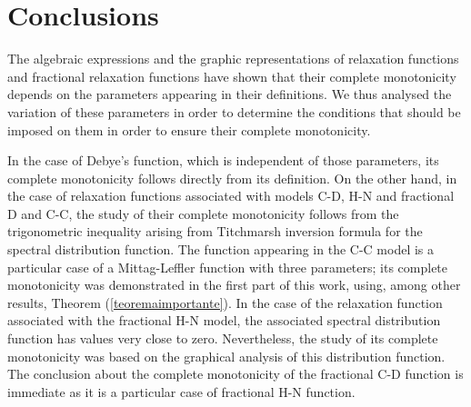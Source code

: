\documentclass[12pt]{amsart}
\numberwithin{equation}{section}
\begin{document}
\section{Conclusions}

The algebraic expressions and the graphic representations of relaxation
functions and fractional relaxation functions have shown that their complete
monotonicity depends on the parameters appearing in their definitions. We
thus analysed the variation of these parameters in order to determine the
conditions that should be imposed on them in order to ensure their complete
monotonicity. 

In the case of Debye's function, which is independent of those parameters,
its complete monotonicity follows directly from its definition. On the
other hand, in the case of relaxation functions associated with models C-D,
H-N and fractional D and C-C, the study of their complete monotonicity
follows from the trigonometric inequality arising from Titchmarsh inversion
formula for the spectral distribution function. The function appearing in the C-C model
is a particular case of a Mittag-Leffler function with three parameters;
its complete monotonicity was demonstrated in the first part of this work,
using, among other results, Theorem (\ref{teoremaimportante}). In the case
of the relaxation function associated with the fractional H-N model, the
associated spectral distribution function has values very close to zero.
Nevertheless, the study of its complete monotonicity was based on the
graphical analysis of this distribution function. The conclusion about the
complete monotonicity of the fractional C-D function is immediate as it is
a particular case of fractional H-N function. 






\end{document}
